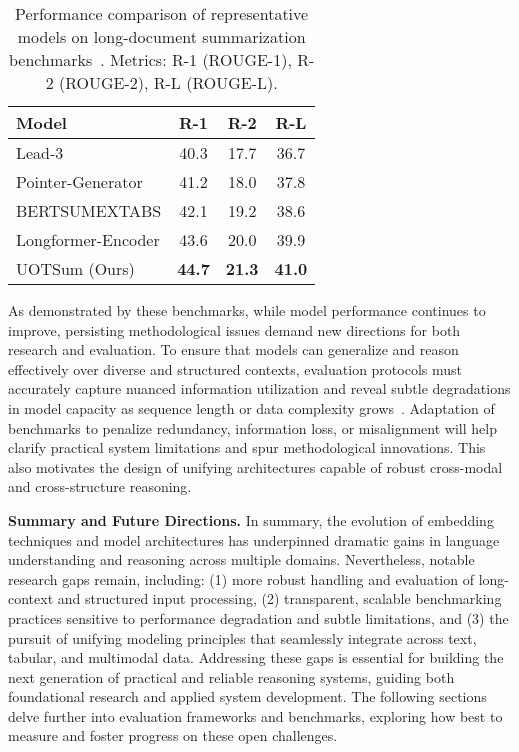 \documentclass[sigconf]{acmart}
\begin{document}
\begin{table*}[htbp]
\centering
\caption{Performance comparison of representative models on long-document summarization benchmarks~\cite{ref75}. Metrics: R-1 (ROUGE-1), R-2 (ROUGE-2), R-L (ROUGE-L).}
\label{tab:long-doc-summarization}
\begin{adjustbox}{max width=\textwidth}
\begin{tabular}{@{}lccc@{}}
\toprule
Model & R-1 & R-2 & R-L \\
\midrule
Lead-3 & 40.3 & 17.7 & 36.7 \\
Pointer-Generator & 41.2 & 18.0 & 37.8 \\
BERTSUMEXTABS & 42.1 & 19.2 & 38.6 \\
Longformer-Encoder & 43.6 & 20.0 & 39.9 \\
UOTSum (Ours) & \textbf{44.7} & \textbf{21.3} & \textbf{41.0} \\
\bottomrule
\end{tabular}
\end{adjustbox}
\end{table*}

As demonstrated by these benchmarks, while model performance continues to improve, persisting methodological issues demand new directions for both research and evaluation. To ensure that models can generalize and reason effectively over diverse and structured contexts, evaluation protocols must accurately capture nuanced information utilization and reveal subtle degradations in model capacity as sequence length or data complexity grows~\cite{ref70,ref75}. Adaptation of benchmarks to penalize redundancy, information loss, or misalignment will help clarify practical system limitations and spur methodological innovations. This also motivates the design of unifying architectures capable of robust cross-modal and cross-structure reasoning.

\textbf{Summary and Future Directions.} In summary, the evolution of embedding techniques and model architectures has underpinned dramatic gains in language understanding and reasoning across multiple domains. Nevertheless, notable research gaps remain, including: (1) more robust handling and evaluation of long-context and structured input processing, (2) transparent, scalable benchmarking practices sensitive to performance degradation and subtle limitations, and (3) the pursuit of unifying modeling principles that seamlessly integrate across text, tabular, and multimodal data. Addressing these gaps is essential for building the next generation of practical and reliable reasoning systems, guiding both foundational research and applied system development. The following sections delve further into evaluation frameworks and benchmarks, exploring how best to measure and foster progress on these open challenges.
\end{document}
